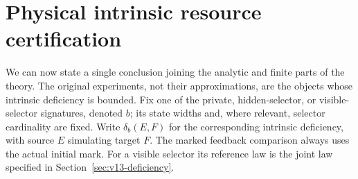 \section{Physical intrinsic resource certification}
\label{sec:v15-certification}
We can now state a single conclusion joining the analytic and finite
parts of the theory. The original experiments, not their approximations,
are the objects whose intrinsic deficiency is bounded. Fix one of the
private, hidden-selector, or visible-selector signatures, denoted $b$;
its state widths and, where relevant, selector cardinality are fixed.
Write $\delta_b(E,F)$ for the corresponding intrinsic deficiency, with
source $E$ simulating target $F$. The marked feedback comparison always
uses the actual initial mark. For a visible selector its reference law
is the joint law specified in Section~\ref{sec:v13-deficiency}.

